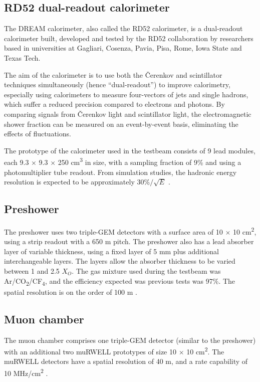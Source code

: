 \subsection{RD52 dual-readout calorimeter} %
The \acrfull{DREAM} calorimeter, also called the RD52 calorimeter, is a dual-readout calorimeter built, developed and tested by the RD52 collaboration by researchers based in universities at Gagliari, Cosenza, Pavia, Pisa, Rome, Iowa State and Texas Tech. 

The aim of the calorimeter is to use both the \v{C}erenkov and scintillator techniques simultaneously (hence ``dual-readout'') to improve calorimetry, especially using calorimeters to measure four-vectors of jets and single hadrons, which suffer a reduced precision compared to electrons and photons. By comparing signals from \v{C}erenkov light and scintillator light, the electromagnetic shower fraction can be measured on an event-by-event basis, eliminating the effects of fluctuations. %

The prototype of the calorimeter used in the testbeam consists of 9 lead modules, each 9.3 $\times$ 9.3 $\times$ 250 cm\textsuperscript{3} in size, with a sampling fraction of 9\% and using a photomultiplier tube readout. From simulation studies, the hadronic energy resolution is expected to be approximately 30\%$/\sqrt{E}$ \cite{idea-dual-readout} \cite{idea-rd52}.

\subsection{Preshower}
The preshower uses two triple-GEM detectors with a surface area of 10 $\times$ 10 cm\textsuperscript{2}, using a strip readout with a 650 \textmu m pitch. The preshower also has a lead absorber layer of variable thickness, using a fixed layer of 5 mm plus additional interchangeable layers. The layers allow the absorber thickness to be varied between 1 and 2.5 $X_O$. The gas mixture used during the testbeam was Ar/CO\textsubscript{2}/CF\textsubscript{4}, and the efficiency expected was previous tests was 97\%. The spatial resolution is on the order of 100 \textmu m \cite{idea-gem}.

\subsection{Muon chamber}
The muon chamber comprises one triple-GEM detector (similar to the preshower) with an additional two \acrshort{muRWELL} prototypes of size 10 $\times$ 10 cm\textsuperscript{2}. The \acrshort{muRWELL} detectors have a spatial resolution of 40 \textmu m, and a rate capability of 10 MHz/cm\textsuperscript{2} \cite{idea-micro-rwell}.

